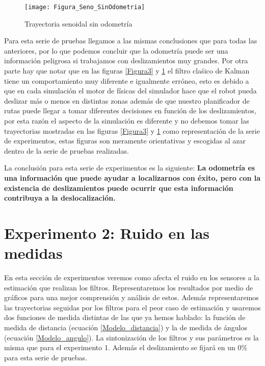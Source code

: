 \begin{figure}[ht!]
\texttt{[image: Figura\_Seno\_SinOdometria]}
\caption{Trayectoria senoidal sin odometría} \label{Figura3_3}
\end{figure}
Para esta serie de pruebas llegamos a las mismas conclusiones que para todas las anteriores, por lo que podemos concluir que la odometría puede ser una información peligrosa si trabajamos con deslizamientos muy grandes.
Por otra parte hay que notar que en las figuras \ref{Figura3} y \ref{Figura3_3} el filtro claśico de Kalman tiene un comportamiento muy diferente e igualmente erróneo, esto es debido a que en cada simulación el motor de físicas del simulador hace que el robot pueda deslizar más o menos en distintas zonas además de que nuestro planificador de rutas puede llegar a tomar diferentes decisiones en función de los deslizamientos, por esta razón el aspecto de la simulación es diferente y no debemos tomar las trayectorias mostradas en las figuras \ref{Figura3} y \ref{Figura3_3} como representación de la serie de experimentos, estas figuras son meramente orientativas y escogidas al azar dentro de la serie de pruebas realizadas.

La conclusión para esta serie de experimentos es la siguiente: \textbf{La odometría es una información que puede ayudar a localizarnos con éxito, pero con la existencia de deslizamientos puede ocurrir que esta información contribuya a la deslocalización.}

\section{Experimento 2: Ruido en las medidas}
En esta sección de experimentos veremos como afecta el ruido en los sensores a la estimación que realizan los filtros.
Representaremos los resultados por medio de gráficos para una mejor comprensión y análisis de estos.
Además representaremos las trayectorias seguidas por los filtros para el peor caso de estimación y usaremos dos funciones de medida distintas de las que ya hemos hablado: la función de medida de distancia (ecuación \ref{Modelo_distancia}) y la de medida de ángulos (ecuación \ref{Modelo_angulo}).
La sintonización de los filtros y sus parámetros es la misma que para el experimento 1.
Además el deslizamiento se fijará en un $0\%$ para esta serie de pruebas.
%
%
%
